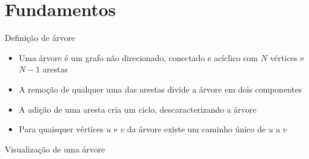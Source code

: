 \section{Fundamentos}

\begin{frame}[fragile]{Definição de árvore}

    \begin{itemize}
        \item Uma árvore é um grafo não direcionado, conectado e acíclico com $N$ vértices e 
        $N - 1$ arestas

        \item A remoção de qualquer uma das arestas divide a árvore em dois componentes

        \item A adição de uma aresta cria um ciclo, descaracterizando a árvore

        \item Para quaisquer vértices $u$ e $v$ da árvore existe um caminho único de $u$ a $v$
    \end{itemize}

\end{frame}

\begin{frame}[fragile]{Visualização de uma árvore}


\end{frame}

